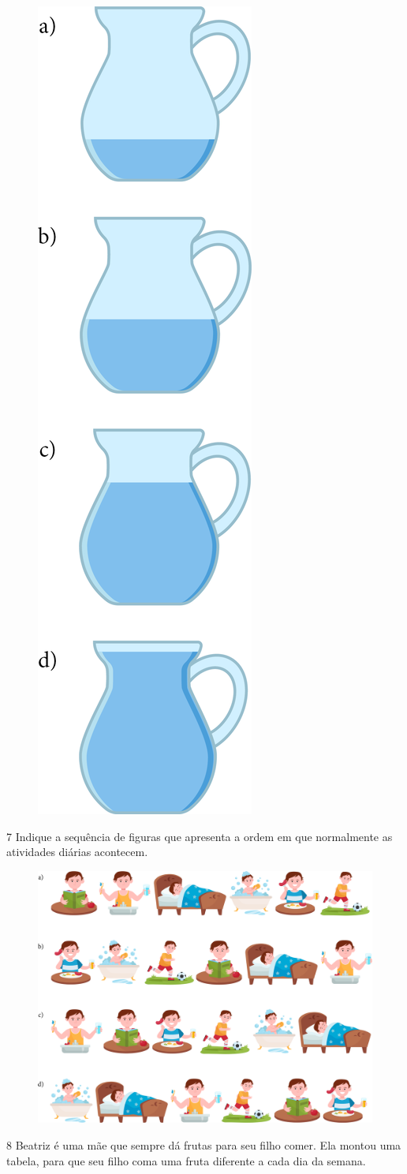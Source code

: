 \begin{figure}[htpb!]
\includegraphics[width=.2\textwidth]{./media/image141.png}
\end{figure}

\pagebreak
\num{7} Indique a sequência de figuras que apresenta a ordem em que normalmente as
atividades diárias acontecem.

\begin{figure}[htpb!]
\includegraphics[width=\textwidth]{./media/image142.png}
\end{figure}


\num{8} Beatriz é uma mãe que sempre dá frutas para seu filho comer. Ela
montou uma tabela, para que seu filho coma uma fruta diferente a cada
dia da semana.

